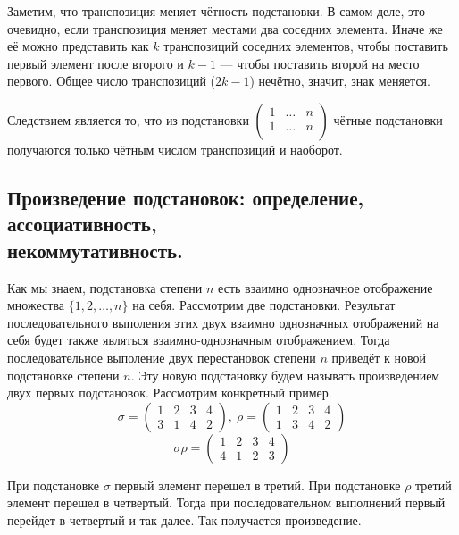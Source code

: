 \documentclass[a4paper, 12pt]{article}
\begin{document}
Заметим, что транспозиция меняет чётность подстановки. В самом деле, это очевидно, если транспозиция меняет местами два соседних элемента. Иначе же её можно представить как $k$ транспозиций соседних элементов, чтобы поставить первый элемент после второго и $k-1$ --- чтобы поставить второй на место первого. Общее число транспозиций ($2k - 1$) нечётно, значит, знак меняется.

Следствием является то, что из подстановки $\left(\begin{smallmatrix}
    1&\ldots&n\\
    1&\ldots&n\\
\end{smallmatrix}\right)$ чётные подстановки получаются только чётным числом транспозиций и наоборот.


\subsection{Произведение подстановок: определение, ассоциативность,\\ некоммутативность.}
Как мы знаем, подстановка степени $n$ есть взаимно однозначное отображение множества $\{1, 2, \ldots, n\}$ на себя. Рассмотрим две подстановки. Результат последовательного выполения этих двух взаимно однозначных отображений на себя будет также являться взаимно-однозначным отображением. Тогда последовательное выполение двух перестановок степени $n$ приведёт к новой подстановке степени $n$. Эту новую подстановку будем называть $\textit{произведением}$ двух первых подстановок. Рассмотрим конкретный пример.
\[\sigma = \begin{pmatrix}1 & 2 & 3 & 4 \\ 3 & 1 & 4 & 2\end{pmatrix},\ \rho = \begin{pmatrix}1 & 2 & 3 & 4 \\ 1 & 3 & 4 & 2\end{pmatrix}\]
\[\sigma\rho = \begin{pmatrix}1 & 2 & 3 & 4 \\ 4 & 1 & 2 & 3\end{pmatrix}\]

При подстановке $\sigma$ $\textit{первый}$ элемент перешел в $\textit{третий}$. При подстановке $\rho$ $\textit{третий}$ элемент перешел в $\textit{четвертый}$. Тогда при последовательном выполнений $\textit{первый}$ перейдет в $\textit{четвертый}$ и так далее. Так получается произведение.
\end{document}
